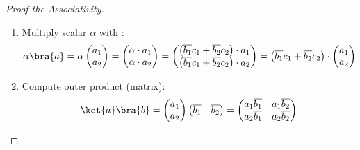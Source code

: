 \begin{proof}[Proof the Associativity]
\begin{enumerate}
        \item Multiply scalar $\alpha$ with :
        \begin{equation*}
            \alpha\bra{a} = \alpha
            \begin{pmatrix}
                a_{1} \\
                a_{2}
            \end{pmatrix}
            =
            \begin{pmatrix}
                \alpha \cdot a_{1} \\
                \alpha \cdot a_{2}
            \end{pmatrix}
            =
            \begin{pmatrix}
                \left(\overline{b_{1}} c_{1} + \overline{b_{2}} c_{2}\right) \cdot a_{1} \\
                \left(\overline{b_{1}} c_{1} + \overline{b_{2}} c_{2}\right) \cdot a_{2}
            \end{pmatrix}
            =
            \left(\overline{b_{1}} c_{1} + \overline{b_{2}} c_{2}\right) \cdot
            \begin{pmatrix}
                a_{1} \\
                a_{2}
            \end{pmatrix}
        \end{equation*}

        \item Compute outer product  (matrix):
        \begin{equation*}
            \ket{a}\bra{b} =
            \begin{pmatrix}
                a_{1} \\
                a_{2}
            \end{pmatrix}
            \begin{pmatrix}
                \overline{b_{1}} & \overline{b_{2}}
            \end{pmatrix}
            =
            \begin{pmatrix}
                a_{1}\overline{b_{1}} & a_{1}\overline{b_{2}} \\
                a_{2}\overline{b_{1}} & a_{2}\overline{b_{2}}
            \end{pmatrix}
        \end{equation*}


\end{enumerate}
\end{proof}
